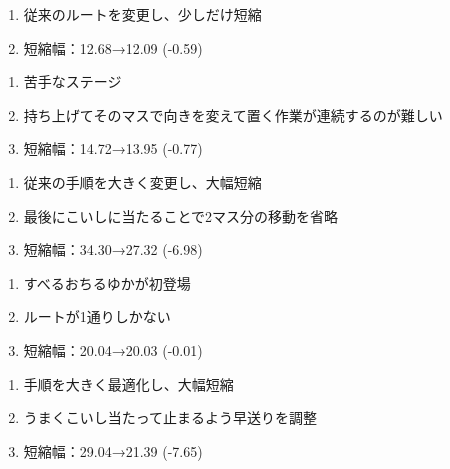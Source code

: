 \begin{enumerate}[label={\sarrow}]
\item 従来のルートを変更し、少しだけ短縮
\item 短縮幅：12.68→12.09 (-0.59)
\end{enumerate}



\begin{enumerate}[label={\sarrow}]
\item 苦手なステージ
\item 持ち上げてそのマスで向きを変えて置く作業が連続するのが難しい
\item 短縮幅：14.72→13.95 (-0.77)
\end{enumerate}



\begin{enumerate}[label={\sarrow}]
\item 従来の手順を大きく変更し、大幅短縮
\item 最後にこいしに当たることで2マス分の移動を省略
\item 短縮幅：34.30→27.32 (-6.98)
\end{enumerate}



\begin{enumerate}[label={\sarrow}]
\item すべるおちるゆかが初登場
\item ルートが1通りしかない
\item 短縮幅：20.04→20.03 (-0.01)
\end{enumerate}



\begin{enumerate}[label={\sarrow}]
\item 手順を大きく最適化し、大幅短縮
\item うまくこいし当たって止まるよう早送りを調整
\item 短縮幅：29.04→21.39 (-7.65)
\end{enumerate}



